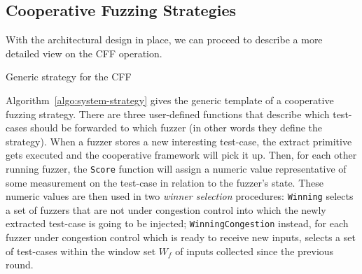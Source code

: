 \subsection{Cooperative Fuzzing Strategies}
With the architectural design in place, we can proceed to describe a more
detailed view on the \ac{CFF} operation.

\begin{algorithm}
    \DontPrintSemicolon
    \BlankLine
\caption{Generic strategy for the \acl{CFF}}
\label{algo:system-strategy}
\end{algorithm}

Algorithm~\ref{algo:system-strategy} gives the generic template of a cooperative
fuzzing strategy. There are three user-defined functions that describe which
test-cases should be forwarded to which fuzzer (in other words they define the
strategy). When a fuzzer stores a new interesting test-case, the extract
primitive gets executed and the cooperative framework will pick it up. Then, for
each other running fuzzer, the \texttt{Score} function will assign a numeric
value representative of some measurement on the test-case in relation to the
fuzzer's state. These numeric values are then used in two \emph{winner
selection} procedures: \texttt{Winning} selects a set of fuzzers that are not
under congestion control into which the newly extracted test-case is going to be
injected; \texttt{WinningCongestion} instead, for each fuzzer under congestion
control which is ready to receive new inputs, selects a set of test-cases within
the window set $W_f$ of inputs collected since the previous round.

